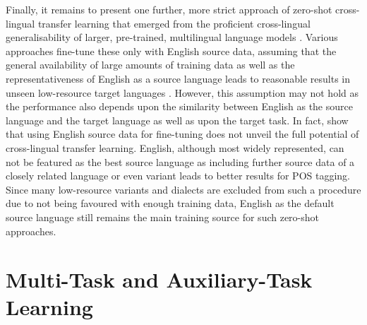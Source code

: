 \documentclass[11pt,a4paper,twoside,openright]{scrbook}
\begin{document}
Finally, it remains to present one further, more strict approach of zero-shot cross-lingual transfer learning that emerged from the proficient cross-lingual generalisability of larger, pre-trained, multilingual language models \citep{de-vries-etal-2022-make}. Various approaches fine-tune these only with English source data, assuming that the general availability of large amounts of training data as well as the representativeness of English as a source language leads to reasonable results in unseen low-resource target languages \citep{artetxe-etal-2020-cross, lewis-etal-2020-mlqa}. However, this assumption may not hold as the performance also depends upon the similarity between English as the source language and the target language as well as upon the target task. In fact, \citet{de-vries-etal-2022-make} show that using English source data for fine-tuning does not unveil the full potential of cross-lingual transfer learning. English, although most widely represented, can not be featured as the best source language as including further source data of a closely related language or even variant leads to better results for POS tagging. Since many low-resource variants and dialects are excluded from such a procedure due to not being favoured with enough training data, English as the default source language still remains the main training source for such zero-shot approaches. 








\section{Multi-Task and Auxiliary-Task Learning}
\end{document}
